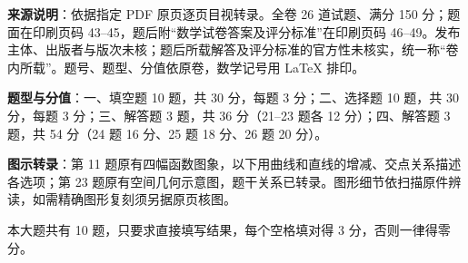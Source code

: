


\begin{gktip}
\textbf{来源说明}：依据指定 PDF 原页逐页目视转录。全卷 26 道试题、满分 150 分；题面在印刷页码 43–45，题后附“数学试卷答案及评分标准”在印刷页码 46–49。发布主体、出版者与版次未核；题后所载解答及评分标准的官方性未核实，统一称“卷内所载”。题号、题型、分值依原卷，数学记号用 LaTeX 排印。

\textbf{题型与分值}：一、填空题 10 题，共 30 分，每题 3 分；二、选择题 10 题，共 30 分，每题 3 分；三、解答题 3 题，共 36 分（21–23 题各 12 分）；四、解答题 3 题，共 54 分（24 题 16 分、25 题 18 分、26 题 20 分）。

\textbf{图示转录}：第 11 题原有四幅函数图象，以下用曲线和直线的增减、交点关系描述各选项；第 23 题原有空间几何示意图，题干关系已转录。图形细节依扫描原件辨读，如需精确图形复刻须另据原页核图。
\end{gktip}


本大题共有 10 题，只要求直接填写结果，每个空格填对得 3 分，否则一律得零分。

